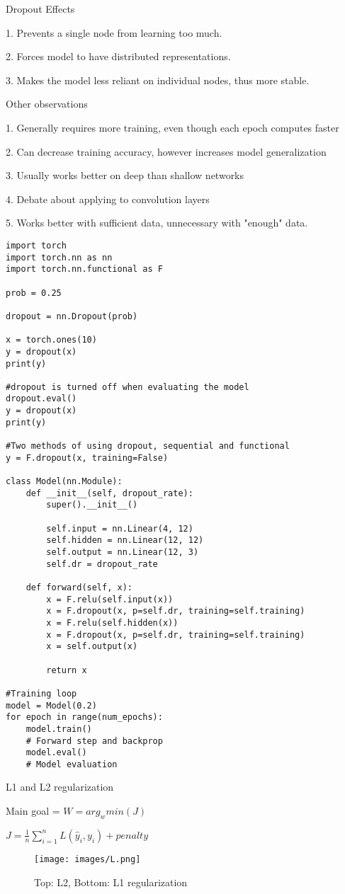 \documentclass[30pt, a4]{article}
\begin{document}
Dropout Effects

1. Prevents a single node from learning too much. 

2. Forces model to have distributed representations.

3. Makes the model less reliant on individual nodes, thus more stable.

Other observations 

1. Generally requires more training, even though each epoch computes faster

2. Can decrease training accuracy, however increases model generalization

3. Usually works better on deep than shallow networks

4. Debate about applying to convolution layers

5. Works better with sufficient data, unnecessary with "enough" data.

\begin{lstlisting}
import torch
import torch.nn as nn
import torch.nn.functional as F

prob = 0.25

dropout = nn.Dropout(prob)

x = torch.ones(10)
y = dropout(x)
print(y)

#dropout is turned off when evaluating the model
dropout.eval()
y = dropout(x)
print(y)

#Two methods of using dropout, sequential and functional
y = F.dropout(x, training=False)

class Model(nn.Module):
    def __init__(self, dropout_rate):
        super().__init__()

        self.input = nn.Linear(4, 12)
        self.hidden = nn.Linear(12, 12)
        self.output = nn.Linear(12, 3)
        self.dr = dropout_rate

    def forward(self, x):
        x = F.relu(self.input(x))
        x = F.dropout(x, p=self.dr, training=self.training)
        x = F.relu(self.hidden(x))
        x = F.dropout(x, p=self.dr, training=self.training)
        x = self.output(x)

        return x

#Training loop 
model = Model(0.2)
for epoch in range(num_epochs):
    model.train()
    # Forward step and backprop
    model.eval()
    # Model evaluation
\end{lstlisting}

L1 and L2 regularization
{
\Large
Main goal = $W = arg_w min(J)$

$J = \frac{1}{n}\sum \limits_{i=1}^n L(\hat y_i, y_i) + penalty$
}
\begin{figure*}[htp]
    \centering
    \texttt{[image: images/L.png]}
    \caption{Top: L2, Bottom: L1 regularization}
\end{figure*}
\end{document}
